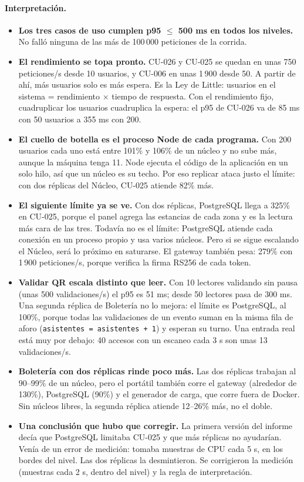 \paragraph{Interpretación.}
\begin{itemize}
\item \textbf{Los tres casos de uso cumplen p95 $\leq$ 500 ms en todos los niveles.} No falló
ninguna de las más de 100\,000 peticiones de la corrida.
\item \textbf{El rendimiento se topa pronto.} CU-026 y CU-025 se quedan en unas 750 peticiones/s
desde 10 usuarios, y CU-006 en unas 1\,900 desde 50. A partir de ahí, más usuarios solo es más
espera. Es la Ley de Little: usuarios en el sistema = rendimiento $\times$ tiempo de respuesta.
Con el rendimiento fijo, cuadruplicar los usuarios cuadruplica la espera: el p95 de CU-026 va de
85 ms con 50 usuarios a 355 ms con 200.
\item \textbf{El cuello de botella es el proceso Node de cada programa.} Con 200 usuarios cada uno
está entre 101\% y 106\% de un núcleo y no sube más, aunque la máquina tenga 11. Node ejecuta el
código de la aplicación en un solo hilo, así que un núcleo es su techo. Por eso replicar ataca
justo el límite: con dos réplicas del Núcleo, CU-025 atiende 82\% más.
\item \textbf{El siguiente límite ya se ve.} Con dos réplicas, PostgreSQL llega a 325\% en
CU-025, porque el panel agrega las estancias de cada zona y es la lectura más cara de las tres.
Todavía no es el límite: PostgreSQL atiende cada conexión en un proceso propio y usa varios
núcleos. Pero si se sigue escalando el Núcleo, será lo próximo en saturarse. El gateway también
pesa: 279\% con 1\,900 peticiones/s, porque verifica la firma RS256 de cada token.
\item \textbf{Validar QR escala distinto que leer.} Con 10 lectores validando sin pausa (unas 500
validaciones/s) el p95 es 51 ms; desde 50 lectores pasa de 300 ms. Una segunda réplica de
Boletería no lo mejora: el límite es PostgreSQL, al 100\%, porque todas las validaciones de un
evento suman en la misma fila de aforo (\texttt{asistentes = asistentes + 1}) y esperan su turno.
Una entrada real está muy por debajo: 40 accesos con un escaneo cada 3 s son unas 13
validaciones/s.
\item \textbf{Boletería con dos réplicas rinde poco más.} Las dos réplicas trabajan al 90--99\% de
un núcleo, pero el portátil también corre el gateway (alrededor de 130\%), PostgreSQL (90\%) y el
generador de carga, que corre fuera de Docker. Sin núcleos libres, la segunda réplica atiende
12--26\% más, no el doble.
\item \textbf{Una conclusión que hubo que corregir.} La primera versión del informe decía que
PostgreSQL limitaba CU-025 y que más réplicas no ayudarían. Venía de un error de medición: tomaba
muestras de CPU cada 5 s, en los bordes del nivel. Las dos réplicas la desmintieron. Se corrigieron
la medición (muestras cada 2 s, dentro del nivel) y la regla de interpretación.
\end{itemize}

